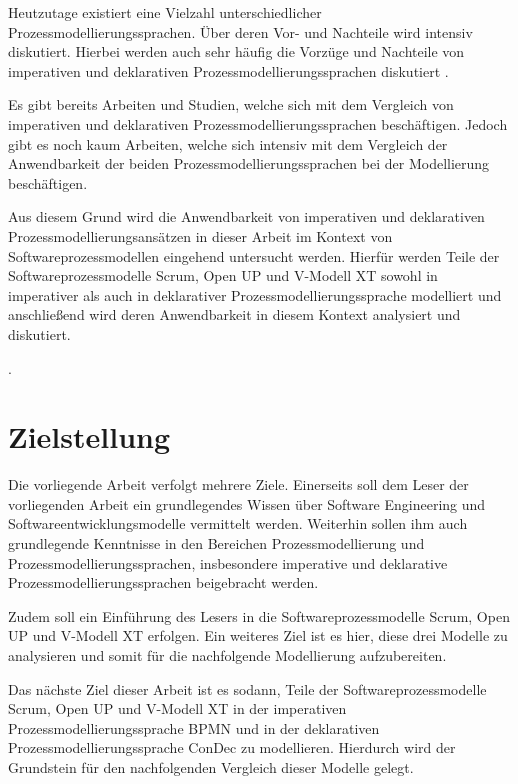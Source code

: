 Heutzutage existiert eine Vielzahl unterschiedlicher Prozessmodellierungssprachen. Über deren Vor- und Nachteile wird intensiv diskutiert. Hierbei werden auch sehr häufig die Vorzüge und Nachteile von imperativen und deklarativen Prozessmodellierungssprachen diskutiert \cite{fahland2010}. \newline

Es gibt bereits Arbeiten und Studien, welche sich mit dem Vergleich von imperativen und deklarativen Prozessmodellierungssprachen beschäftigen. Jedoch gibt es noch kaum Arbeiten, welche sich intensiv mit dem Vergleich der Anwendbarkeit der beiden Prozessmodellierungssprachen bei der Modellierung beschäftigen.\newline

Aus diesem Grund wird die Anwendbarkeit von imperativen und deklarativen Prozessmodellierungsansätzen in dieser Arbeit im Kontext von Softwareprozessmodellen eingehend untersucht werden. Hierfür werden Teile der Softwareprozessmodelle Scrum, Open UP und V-Modell XT sowohl in imperativer als auch in deklarativer Prozessmodellierungssprache modelliert und anschließend wird deren Anwendbarkeit in diesem Kontext analysiert und diskutiert.\newline

.


\section{Zielstellung}
Die vorliegende Arbeit verfolgt mehrere Ziele. Einerseits soll dem Leser der vorliegenden Arbeit ein grundlegendes Wissen über Software Engineering und Softwareentwicklungsmodelle vermittelt werden. Weiterhin sollen ihm auch grundlegende Kenntnisse in den Bereichen Prozessmodellierung und Prozessmodellierungssprachen, insbesondere imperative und deklarative Prozessmodellierungssprachen beigebracht werden. \newline

Zudem soll ein Einführung des Lesers in die Softwareprozessmodelle Scrum, Open UP und V-Modell XT erfolgen. Ein weiteres Ziel ist es hier, diese drei Modelle zu analysieren und somit für die nachfolgende Modellierung aufzubereiten.\newline

Das nächste Ziel dieser Arbeit ist es sodann, Teile der Softwareprozessmodelle Scrum, Open UP und V-Modell XT in der imperativen Prozessmodellierungssprache BPMN und in der deklarativen Prozessmodellierungssprache ConDec zu modellieren. Hierdurch wird der Grundstein für den nachfolgenden Vergleich dieser Modelle gelegt.\newline

